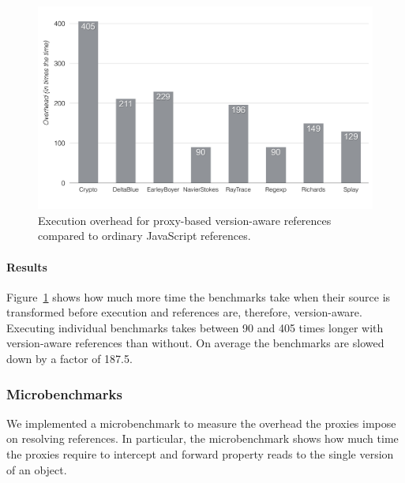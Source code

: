 \begin{figure}[h]
    \centering
    \includegraphics[width=\textwidth]{figures/6_evaluation/3_executionOverhead.pdf}
    \caption{Execution overhead for proxy-based version-aware references compared to ordinary JavaScript references.}
    \label{fig:ExecutionOverhead}
\end{figure}

\paragraph{Results}
Figure~\ref{fig:ExecutionOverhead} shows how much more time the benchmarks take when their source is transformed before execution and references are, therefore, version-aware.
Executing individual benchmarks takes between 90 and 405 times longer with version-aware references than without.
On average the benchmarks are slowed down by a factor of 187.5.


\subsubsection{Microbenchmarks}

We implemented a microbenchmark to measure the overhead the proxies impose on resolving references.
In particular, the microbenchmark shows how much time the proxies require to intercept and forward property reads to the single version of an object.

